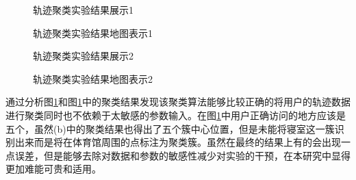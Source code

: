 \begin{figure}[htb]
  \centering%
  \hspace{4em}%
  \caption{轨迹聚类实验结果展示1}
  \label{fig:3_12_1}
\end{figure}
\begin{figure}[htb]
  \centering%
  \hspace{4em}%
  \caption{轨迹聚类实验结果地图表示1}
  \label{fig:3_13_1}
\end{figure}
\begin{figure}[htb]
  \centering%
  \hspace{4em}%
  \caption{轨迹聚类实验结果展示2}
  \label{fig:3_12_2}
\end{figure}
\begin{figure}[htb]
  \centering%
  \hspace{4em}%
  \caption{轨迹聚类实验结果地图表示2}
  \label{fig:3_13_2}
\end{figure}
\par 通过分析图\ref{fig:3_12_1}和图\ref{fig:3_12_1}中的聚类结果发现该聚类算法能够比较正确的将用户的轨迹数据进行聚类同时也不依赖于太敏感的参数输入。在图\ref{fig:3_12_1}中用户正确访问的地方应该是五个，虽然(b)中的聚类结果也得出了五个簇中心位置，但是未能将寝室这一簇识别出来而是将在体育馆周围的点标注为聚类簇。虽然在最终的结果上有的会出现一点误差，但是能够去除对数据和参数的敏感性减少对实验的干预，在本研究中显得更加难能可贵和适用。
